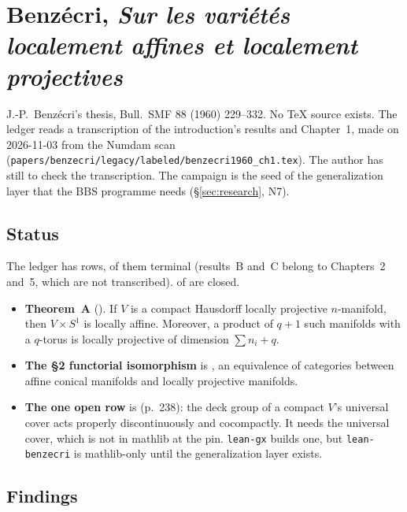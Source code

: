 \section{Benzécri, \emph{Sur les variétés localement affines et localement projectives}}\label{sec:benzecri}

J.-P.~Benzécri's thesis, Bull.\ SMF 88 (1960) 229--332. No \TeX{} source exists. The ledger reads a
transcription of the introduction's results and Chapter~1, made on 2026-11-03 from the Numdam scan
(\texttt{papers/benzecri/legacy/labeled/benzecri1960\_ch1.tex}). The author has still to check the
transcription. The campaign is the seed of the generalization layer that the BBS programme needs
(\S\ref{sec:research}, N7).

\subsection{Status}

The ledger has \numBenzecriStatements{} rows, \numBenzecriTerminal{} of them terminal
(results~B and~C belong to Chapters~2 and~5, which are not transcribed). \numBenzecriClosed{}
of \numBenzecriTarget{} are closed.
\begin{itemize}
\item \textbf{Theorem~A} (). If $V$ is a compact Hausdorff locally projective
  $n$-manifold, then $V\times S^1$ is locally affine. Moreover, a product of $q+1$ such manifolds
  with a $q$-torus is locally projective of dimension $\sum n_i+q$.
\item \textbf{The \S2 functorial isomorphism} is , an equivalence of
  categories between affine conical manifolds and locally projective manifolds.
\item \textbf{The one open row} is  (p.~238): the
  deck group of a compact $V$'s universal cover acts properly discontinuously and cocompactly.
  It needs the universal cover, which is not in mathlib at the pin. \texttt{lean-gx} builds one,
  but \texttt{lean-benzecri} is mathlib-only until the generalization layer exists.
\end{itemize}

\subsection{Findings}

